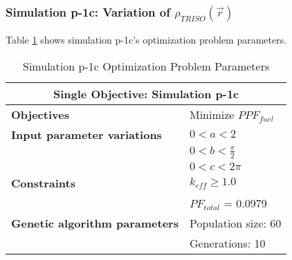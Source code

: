 \subsubsection{Simulation p-1c: Variation of $\rho_{TRISO}(\vec{r})$}
Table \ref{tab:simulationp1c} shows simulation p-1c's optimization problem parameters. 
\begin{table}[htbp!]
    \centering
    \onehalfspacing
    \caption{Simulation p-1c Optimization Problem Parameters}
	\label{tab:simulationp1c}
    \footnotesize
    \begin{tabular}{l|p{3cm}}
    \hline 
    \multicolumn{2}{c}{\textbf{Single Objective: Simulation p-1c}} \\
    \hline 
    \textbf{Objectives} & Minimize $PPF_{fuel}$ \\
    \hline 
    \textbf{Input parameter variations} & $0<a<2$ \\
    & $0<b<\frac{\pi}{2}$ \\
    & $0<c<2\pi$ \\
    \hline
    \textbf{Constraints} & $k_{eff} \geq 1.0$\\ 
    & $PF_{total}$ = 0.0979\\
    \hline 
    \textbf{Genetic algorithm parameters} & Population size: 60 \\
    & Generations: 10 \\
    \hline
    \end{tabular}
\end{table}

